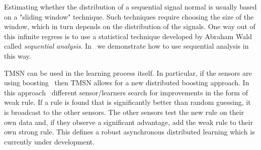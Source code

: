 Estimating whether the distribution of a sequential signal normal is usually based on a "sliding window" technique. Such techniques require choosing the size of the window, which in turn depends on the distribution of the signals.
One way out of this infinite regress is to use a statistical technique developed by Abraham Wald~\cite{wald} 
called {\em sequential analysis}. In~\cite{TMSN} we demonstrate how to use sequential analysis in this way.

TMSN can be used in the learning process itself. In particular, if the sensors are using boosting~\cite{boostingbook} then TMSN allows for a new distributed boosting approach. In this approach~\cite{fastboost} different sensor/learners search for 
improvements in the form of weak rule. If a rule is found that is significantly better than random guessing, it is broadcast to the other sensors. The other sensors test the new rule on their own data and, if they observe a significant advantage, add the weak rule to their own strong rule. This defines a robust asynchronous distributed learning which is currently under development.